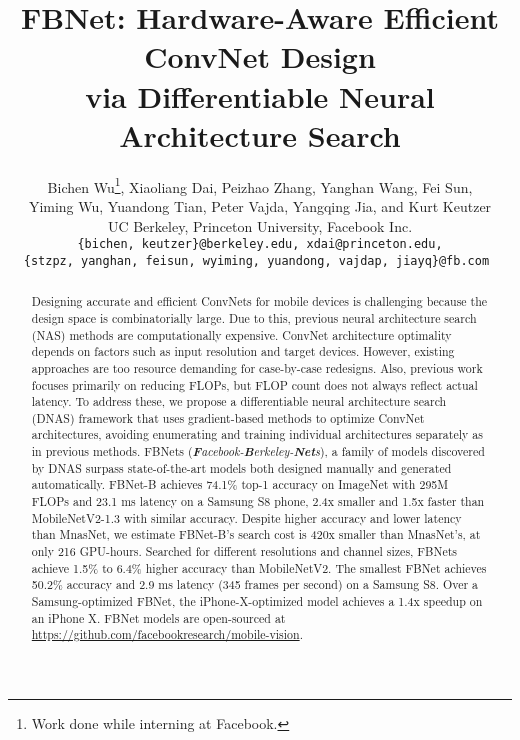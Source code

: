 \documentclass[10pt,twocolumn,letterpaper]{article}
\begin{document}
\title{FBNet: Hardware-Aware Efficient ConvNet Design \\
via Differentiable Neural Architecture Search}

\author{Bichen Wu\thanks{Work done while interning at Facebook.}, Xiaoliang Dai, Peizhao Zhang, Yanghan Wang, Fei Sun, \\
Yiming Wu, Yuandong Tian, Peter Vajda, Yangqing Jia, and Kurt Keutzer\\
UC Berkeley, Princeton University, Facebook Inc.\\
\tt\small \{bichen, keutzer\}@berkeley.edu, xdai@princeton.edu, \\
\tt\small \{stzpz, yanghan, feisun, wyiming, yuandong, vajdap, jiayq\}@fb.com
}

\maketitle


\begin{abstract}
Designing accurate and efficient ConvNets for mobile devices is challenging because the design space is combinatorially large. Due to this, previous neural architecture search (NAS) methods are computationally expensive. ConvNet architecture optimality depends on factors such as input resolution and target devices. However, existing approaches are too resource demanding for case-by-case redesigns. Also, previous work focuses primarily on reducing FLOPs, but FLOP count does not always reflect actual latency. To address these, we propose a differentiable neural architecture search (DNAS) framework that uses gradient-based methods to optimize ConvNet architectures, avoiding enumerating and training individual architectures separately as in previous methods. FBNets (\textit{\textbf{F}acebook-\textbf{B}erkeley-\textbf{Net}s}), a family of models discovered by DNAS surpass state-of-the-art models both designed manually and generated automatically. FBNet-B achieves 74.1\% top-1 accuracy on ImageNet with 295M FLOPs and 23.1 ms latency on a Samsung S8 phone, 2.4x smaller and 1.5x faster than MobileNetV2-1.3\cite{sandler2018mobilenetv2} with similar accuracy. Despite higher accuracy and lower latency than MnasNet\cite{tan2018mnasnet}, we estimate FBNet-B's search cost is 420x smaller than MnasNet's, at only 216 GPU-hours. Searched for different resolutions and channel sizes, FBNets achieve 1.5\% to 6.4\% higher accuracy than MobileNetV2. The smallest FBNet achieves 50.2\% accuracy and 2.9 ms latency (345 frames per second) on a Samsung S8. Over a Samsung-optimized FBNet, the iPhone-X-optimized model achieves a 1.4x speedup on an iPhone X. FBNet models are open-sourced at \url{https://github.com/facebookresearch/mobile-vision}.
\end{abstract}
\end{document}
